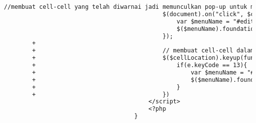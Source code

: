 \begin{itemize}
\begin{lstlisting}[frame=single, label={lst:perbaikan_2.1.1_keyboard_entri_jadwal_dosen}, language=diff, caption=Perbaikan Kriteria Sukses 2.1.1 - Penggunaan \textit{Keyboard} pada Halaman Entri Jadwal Dosen]
                                             //membuat cell-cell yang telah diwarnai jadi memunculkan pop-up untuk mengedit jadwal ketika diklik oleh mouse
                                             $(document).on("click", $cellLocation, function () {
                                                 var $menuName = "#edit_menu<?php echo $dataHariIni->id ?>";
                                                 $($menuName).foundation('open');
                                             });
        +                                    
        +                                    // membuat cell-cell dalam tabel dapat diakses menggunakan keyboard
        +                                    $($cellLocation).keyup(function(e){
        +                                        if(e.keyCode == 13){
        +                                            var $menuName = "#edit_menu<?php echo $dataHariIni->id ?>";
        +                                            $($menuName).foundation('open');
        +                                        }
        +                                    })
                                         </script>
                                         <?php
                                     }
    \end{lstlisting}
\end{itemize}


